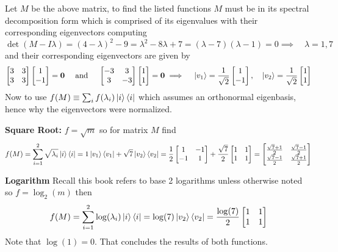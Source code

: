 \documentclass[12pt]{exam}
\begin{document}
\begin{solution}
    Let $M$ be the above matrix, to find the listed functions $M$ must be in its spectral decomposition form which is comprised of its eigenvalues with their corresponding eigenvectors computing 
    $$\det (M-I\lambda) = (4-\lambda)^2 - 9 = \lambda^2 -8\lambda + 7 = (\lambda -7)(\lambda-1) = 0 \implies \quad
    \lambda = 1, 7$$
    and their corresponding eigenvectors are given by 
    $$
    \begin{bmatrix}
    3 & 3 \\ 3 & 3
    \end{bmatrix}\begin{bmatrix}
        1 \\ -1
    \end{bmatrix} = \textbf{0} 
    \quad \text{ and } \quad 
    \begin{bmatrix}
    -3 & 3 \\ 3 & -3
    \end{bmatrix}\begin{bmatrix}
        1 \\ 1
    \end{bmatrix} = \textbf{0} \implies  \quad \ket{v_1}=\frac{1}{\sqrt{2}}\begin{bmatrix}
        1 \\ -1
    \end{bmatrix}, \quad \ket{v_2}=\frac{1}{\sqrt{2}}\begin{bmatrix}
        1 \\ 1
    \end{bmatrix}
    $$
    Now to use $f(M) \equiv \sum_i f(\lambda_i) \ket{i}\bra{i}$ which assumes an orthonormal eigenbasis, hence why the eigenvectors were normalized.
    
    
    \textbf{Square Root:} $f = \sqrt{m}$ so for matrix $M$ find 
    $$
    f(M) = \sum_{i=1}^2\sqrt{\lambda_i}\ket{i}\bra{i}=
    1\ket{v_1}\bra{v_1} + \sqrt{7}\ket{v_2}\bra{v_2} = 
    \frac{1}{2}\begin{bmatrix}
        1 & -1 \\ -1 & 1
    \end{bmatrix} + \frac{\sqrt{7}}{2}\begin{bmatrix}
        1 & 1 \\ 1 & 1
    \end{bmatrix} = \begin{bmatrix}
        \frac{\sqrt{7} + 1}{2} & \frac{\sqrt{7} - 1}{2} \\
        \frac{\sqrt{7} - 1}{2} & \frac{\sqrt{7} + 1}{2}
    \end{bmatrix}$$

    \textbf{Logarithm} Recall this book refers to base 2 logarithms unless otherwise noted so $f = \log_2(m)$ then 
    $$
    f(M) = \sum_{i=1}^2\log(\lambda_i)\ket{i}\bra{i}= \log(7)\ket{v_2}\bra{v_2}=\frac{\log(7)}{2}\begin{bmatrix}
        1 & 1 \\ 1 & 1
    \end{bmatrix}$$
    Note that $\log(1) = 0$. That concludes the results of both functions.
\end{solution}
\end{document}
